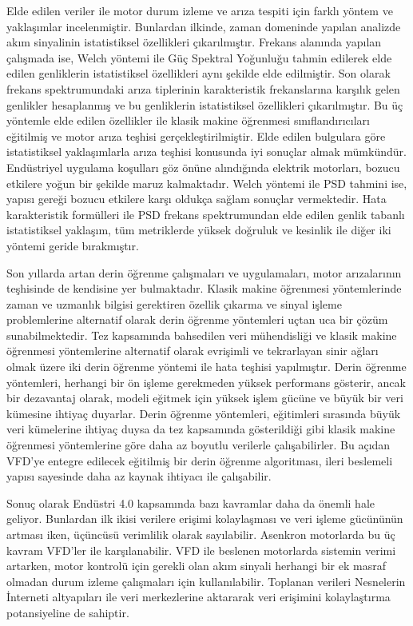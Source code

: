 Elde edilen veriler ile motor durum izleme ve arıza tespiti için farklı yöntem ve yaklaşımlar incelenmiştir. Bunlardan ilkinde, zaman domeninde yapılan analizde akım sinyalinin istatistiksel özellikleri çıkarılmıştır. Frekans alanında yapılan çalışmada ise, Welch yöntemi ile Güç Spektral Yoğunluğu tahmin edilerek elde edilen genliklerin istatistiksel özellikleri aynı şekilde elde edilmiştir. Son olarak frekans spektrumundaki arıza tiplerinin karakteristik frekanslarına karşılık gelen genlikler hesaplanmış ve bu genliklerin istatistiksel özellikleri çıkarılmıştır. Bu üç yöntemle elde edilen özellikler ile klasik makine öğrenmesi sınıflandırıcıları eğitilmiş ve motor arıza teşhisi gerçekleştirilmiştir. Elde edilen bulgulara göre istatistiksel yaklaşımlarla arıza teşhisi konusunda iyi sonuçlar almak mümkündür. Endüstriyel uygulama koşulları göz önüne alındığında elektrik motorları, bozucu etkilere yoğun bir şekilde maruz kalmaktadır. Welch yöntemi ile PSD tahmini ise, yapısı gereği bozucu etkilere karşı oldukça sağlam sonuçlar vermektedir. Hata karakteristik formülleri ile PSD frekans spektrumundan elde edilen genlik tabanlı istatistiksel yaklaşım, tüm metriklerde yüksek doğruluk ve kesinlik ile diğer iki yöntemi geride bırakmıştır.

Son yıllarda artan derin öğrenme çalışmaları ve uygulamaları, motor arızalarının teşhisinde de kendisine yer bulmaktadır. Klasik makine öğrenmesi yöntemlerinde zaman ve uzmanlık bilgisi gerektiren özellik çıkarma ve sinyal işleme problemlerine alternatif olarak derin öğrenme yöntemleri uçtan uca bir çözüm sunabilmektedir. Tez kapsamında bahsedilen veri mühendisliği ve klasik makine öğrenmesi yöntemlerine alternatif olarak evrişimli ve tekrarlayan sinir ağları olmak üzere iki derin öğrenme yöntemi ile hata teşhisi yapılmıştır. Derin öğrenme yöntemleri, herhangi bir ön işleme gerekmeden yüksek performans gösterir, ancak bir dezavantaj olarak, modeli eğitmek için yüksek işlem gücüne ve büyük bir veri kümesine ihtiyaç duyarlar. Derin öğrenme yöntemleri, eğitimleri sırasında büyük veri kümelerine ihtiyaç duysa da tez kapsamında gösterildiği gibi klasik makine öğrenmesi yöntemlerine göre daha az boyutlu verilerle çalışabilirler. Bu açıdan VFD'ye entegre edilecek eğitilmiş bir derin öğrenme algoritması, ileri beslemeli yapısı sayesinde daha az kaynak ihtiyacı ile çalışabilir.

Sonuç olarak Endüstri 4.0 kapsamında bazı kavramlar daha da önemli hale geliyor. Bunlardan ilk ikisi verilere erişimi kolaylaşması ve veri işleme gücününün artması iken, üçüncüsü verimlilik olarak sayılabilir. Asenkron motorlarda bu üç kavram VFD'ler ile karşılanabilir. VFD ile beslenen motorlarda sistemin verimi artarken, motor kontrolü için gerekli olan akım sinyali herhangi bir ek masraf olmadan durum izleme çalışmaları için kullanılabilir. Toplanan verileri Nesnelerin İnterneti altyapıları ile veri merkezlerine aktararak veri erişimini kolaylaştırma potansiyeline de sahiptir.
 
